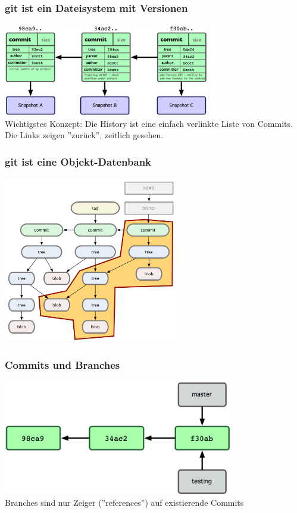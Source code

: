 \begin{frame}
  \frametitle{git ist ein Dateisystem mit Versionen}
  \begin{center}
    \includegraphics[width=9cm]{img/history_detailed.png} \\
    Wichtigstes Konzept: Die History ist eine einfach verlinkte Liste von Commits. Die Links zeigen ''zurück'', zeitlich gesehen.
  \end{center}
\end{frame}

\begin{frame}
  \frametitle{git ist eine Objekt-Datenbank}
  \begin{center}
    \includegraphics[width=7.8cm]{img/tree_commit.pdf}
  \end{center}
\end{frame}

\begin{frame}
  \frametitle{Commits und Branches}
  \begin{center}
    \includegraphics[width=10cm]{img/two_branches.png} \\
    Branches sind nur Zeiger (''references'') auf existierende Commits
  \end{center}
\end{frame}

